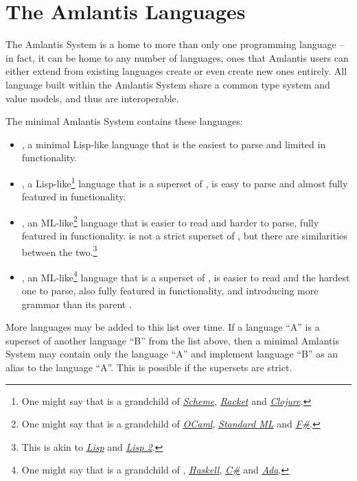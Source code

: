 \newpage

\section{The Amlantis Languages}
\label{sec:amlantis-languages}

The Amlantis System is a home to more than only one programming language -- in fact, it can be home to any number of languages, ones that Amlantis users can either extend from existing languages create or even create new ones entirely. All language built within the Amlantis System share a common type system and value models, and thus are interoperable.

The minimal Amlantis System contains these languages:

\begin{itemize}
  \item \AmlKernel, a minimal Lisp-like language that is the easiest to parse and limited in functionality.
  
  \item \AmlBase, a Lisp-like\footnote{One might say that \AmlBase is a grandchild of \href{https://www.scheme.org/}{{\em Scheme}}, \href{https://racket-lang.org/}{{\em Racket}} and \href{https://clojure.org}{{\em Clojure}}.} language that is a superset of \AmlKernel, is easy to parse and almost fully featured in functionality.
  
  \item \AmlCore, an ML-like\footnote{One might say that \AmlCore is a grandchild of \href{https://ocaml.org/}{{\em OCaml}}, \href{https://smlfamily.github.io/}{{\em Standard ML}} and \href{https://fsharp.org/}{{\em F\#}}.} language that is easier to read and harder to parse, fully featured in functionality. \AmlCore is not a strict superset of \AmlBase, but there are similarities between the two.\footnote{This is akin to \href{https://en.wikipedia.org/wiki/Lisp_(programming_language)}{{\em Lisp}} and \href{https://en.wikipedia.org/wiki/LISP_2}{{\em Lisp 2}}.}
  
  \item \Aml, an ML-like\footnote{One might say that \Aml is a grandchild of \AmlCore, \href{https://www.haskell.org/}{{\em Haskell}}, \href{https://learn.microsoft.com/en-us/dotnet/csharp/}{{\em C\#}} and \href{https://www.adaic.org/}{{\em Ada}}.} language that is a superset of \AmlCore, is easier to read and the hardest one to parse, also fully featured in functionality, and introducing more grammar than its parent \AmlCore.
  
\end{itemize}

More languages may be added to this list over time. If a language ``A'' is a superset of another language ``B'' from the list above, then a minimal Amlantis System may contain only the language ``A'' and implement language ``B'' as an alias to the language ``A''. This is possible if the supersets are strict. 








